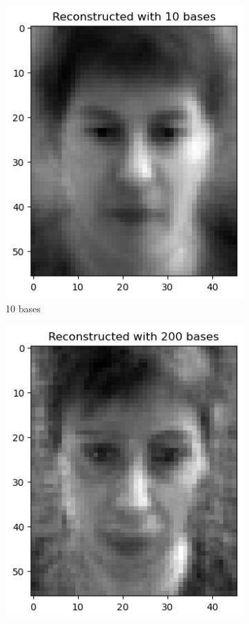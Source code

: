 \begin{figure}
\begin{subfigure}[t]{0.2\linewidth}
		\includegraphics[width=\linewidth]{image/q1_recon_test_10.png}
		\caption{10 bases}
		\label{fig:test_re_10}
	\end{subfigure}
    \hfill
	\begin{subfigure}[t]{0.2\linewidth}
		\centering
		\includegraphics[width=\linewidth]{image/q1_recon_test_200.png}

\end{subfigure}
\end{figure}
